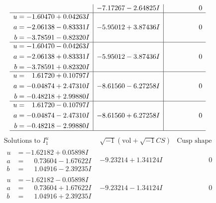 \documentclass[1p]{elsarticle_modified}
\theoremstyle{definition}
\newcommand{\I}{\sqrt{-1}}
\begin{document}
$$\begin{array}{c|c|c}
 & -7.17267 - 2.64825 I & \phantom{-0.000000 } 0 \\ \hline\begin{aligned}
u &= -1.60470 + 0.04263 I \\
a &= -2.06138 - 0.83331 I \\
b &= -3.78591 - 0.82320 I\end{aligned}
 & -5.95012 + 3.87436 I & \phantom{-0.000000 } 0 \\ \hline\begin{aligned}
u &= -1.60470 - 0.04263 I \\
a &= -2.06138 + 0.83331 I \\
b &= -3.78591 + 0.82320 I\end{aligned}
 & -5.95012 - 3.87436 I & \phantom{-0.000000 } 0 \\ \hline\begin{aligned}
u &= \phantom{-}1.61720 + 0.10797 I \\
a &= -0.04874 + 2.47310 I \\
b &= -0.48218 + 2.99880 I\end{aligned}
 & -8.61560 - 6.27258 I & \phantom{-0.000000 } 0 \\ \hline\begin{aligned}
u &= \phantom{-}1.61720 - 0.10797 I \\
a &= -0.04874 - 2.47310 I \\
b &= -0.48218 - 2.99880 I\end{aligned}
 & -8.61560 + 6.27258 I & \phantom{-0.000000 } 0\\
 \hline 
 \end{array}$$\newpage$$\begin{array}{c|c|c}  
\text{Solutions to }I^u_{1}& \I (\text{vol} + \sqrt{-1}CS) & \text{Cusp shape}\\
 \hline 
\begin{aligned}
u &= -1.62182 + 0.05898 I \\
a &= \phantom{-}0.73604 - 1.67622 I \\
b &= \phantom{-}1.04916 - 2.39235 I\end{aligned}
 & -9.23214 + 1.34124 I & \phantom{-0.000000 } 0 \\ \hline\begin{aligned}
u &= -1.62182 - 0.05898 I \\
a &= \phantom{-}0.73604 + 1.67622 I \\
b &= \phantom{-}1.04916 + 2.39235 I\end{aligned}
 & -9.23214 - 1.34124 I & \phantom{-0.000000 } 0 \\ \hline\begin{aligned}

\end{aligned}
\end{array}$$
\end{document}
